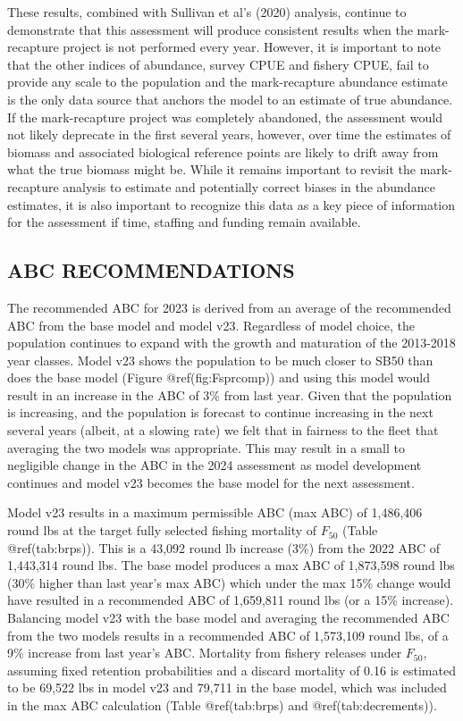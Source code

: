 \documentclass[
]{article}
\begin{document}
These results, combined with Sullivan et al's (2020) analysis, continue
to demonstrate that this assessment will produce consistent results when
the mark-recapture project is not performed every year. However, it is
important to note that the other indices of abundance, survey CPUE and
fishery CPUE, fail to provide any scale to the population and the
mark-recapture abundance estimate is the only data source that anchors
the model to an estimate of true abundance. If the mark-recapture
project was completely abandoned, the assessment would not likely
deprecate in the first several years, however, over time the estimates
of biomass and associated biological reference points are likely to
drift away from what the true biomass might be. While it remains
important to revisit the mark-recapture analysis to estimate and
potentially correct biases in the abundance estimates, it is also
important to recognize this data as a key piece of information for the
assessment if time, staffing and funding remain available.

\hypertarget{abc-recommendations}{%
\subsection{ABC RECOMMENDATIONS}\label{abc-recommendations}}

The recommended ABC for 2023 is derived from an average of the
recommended ABC from the base model and model v23. Regardless of model
choice, the population continues to expand with the growth and
maturation of the 2013-2018 year classes. Model v23 shows the population
to be much closer to SB50 than does the base model (Figure
@ref(fig:Fsprcomp)) and using this model would result in an increase in
the ABC of 3\% from last year. Given that the population is increasing,
and the population is forecast to continue increasing in the next
several years (albeit, at a slowing rate) we felt that in fairness to
the fleet that averaging the two models was appropriate. This may result
in a small to negligible change in the ABC in the 2024 assessment as
model development continues and model v23 becomes the base model for the
next assessment.

Model v23 results in a maximum permissible ABC (max ABC) of 1,486,406
round lbs at the target fully selected fishing mortality of \(F_{50}\)
(Table @ref(tab:brps)). This is a 43,092 round lb increase (3\%) from
the 2022 ABC of 1,443,314 round lbs. The base model produces a max ABC
of 1,873,598 round lbs (30\% higher than last year's max ABC) which
under the max 15\% change would have resulted in a recommended ABC of
1,659,811 round lbs (or a 15\% increase). Balancing model v23 with the
base model and averaging the recommended ABC from the two models results
in a recommended ABC of 1,573,109 round lbs, of a 9\% increase from last
year's ABC. Mortality from fishery releases under \(F_{50}\), assuming
fixed retention probabilities and a discard mortality of 0.16 is
estimated to be 69,522 lbs in model v23 and 79,711 in the base model,
which was included in the max ABC calculation (Table @ref(tab:brps) and
@ref(tab:decrements)).
\end{document}
